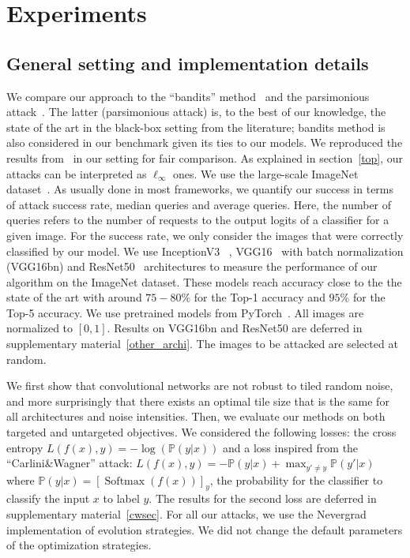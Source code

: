 \section{Experiments}
\label{expe}
\subsection{General setting and implementation details}
We compare our approach to the ``bandits'' method~\citep{ilyas2018prior} and the parsimonious attack~\citep{moon19aparsimonous}. The latter (parsimonious attack) is, to the best of our knowledge, the state of the art in the black-box setting from the literature; bandits method is also considered in our benchmark given its ties to our models. We reproduced the results from~\citep{moon19aparsimonous} in our setting for fair comparison. As explained in section~\ref{top}, our attacks can be interpreted as $\ell_\infty$ ones. We use the large-scale ImageNet dataset~\citep{imagenet_cvpr09}. As usually done in most frameworks, we quantify our success in terms of attack success rate, median queries and average queries. Here, the number of queries refers to the number of requests to the output logits of a classifier for a given image. For the success rate, we only consider the images that were correctly classified by our model. We use InceptionV3~\citep{szegedy2017inception} , VGG16~\citep{simonyan2014very} with batch normalization (VGG16bn) and ResNet50~\citep{he2016deep}  architectures to measure the performance of our algorithm on the ImageNet dataset. These models reach accuracy close to the the state of the art with around $75-80\%$ for the Top-1 accuracy and $95\%$ for the Top-5 accuracy. We use pretrained models from PyTorch~\citep{paszke2017automatic}. All images are normalized to $\left[0,1\right]$. Results on VGG16bn and ResNet50 are deferred in supplementary material~\ref{other_archi}. The  images to be attacked are selected at random.

We first show that convolutional networks are not robust to tiled random  noise, and more surprisingly that there exists an optimal tile size that is the same for all architectures and noise intensities. Then, we evaluate our methods on both targeted and untargeted objectives. We considered the following losses: the cross entropy $L(f(x),y)=-\log(\mathbb{P}(y|x))$ and a loss inspired from the ``Carlini\&Wagner'' attack: $L(f(x),y)=-\mathbb{P}(y|x)+\max_{y'\neq y}\mathbb{P}(y'|x)$ where $\mathbb{P}(y|x)=\left[\operatorname{Softmax}(f(x))\right]_y$, the probability for the classifier to classify the input $x$ to label $y$. The results for the second loss are deferred in supplementary material~\ref{cwsec}. For all our attacks, we use the Nevergrad~\citep{nevergrad} implementation of evolution strategies. We did not change the default parameters of the optimization strategies.

